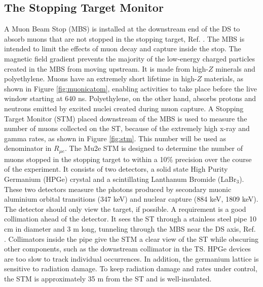 \subsection{The Stopping Target Monitor}
A Muon Beam Stop (MBS) is installed at the downstream end of the DS to 
absorb muons that are not stopped in the stopping target, Ref. \cite{bartoszek2015mu2e}. 
The MBS is intended to limit 
the effects of muon decay and capture inside the stop. The magnetic field gradient prevents 
the majority of the low-energy charged particles created in the MBS from moving upstream. 
It is made from high-$Z$ minerals and polyethylene. Muons have an extremely short lifetime 
in high-$Z$ materials, as shown in Figure \ref{fig:muonicatom}, enabling activities to take 
place before the live window starting at 640 ns. Polyethylene, on the other hand, absorbs 
protons and neutrons emitted by excited nuclei created during muon capture.
A Stopping Target Monitor (STM) 
placed downstream of the MBS is used to measure the number of muons collected on the ST, because of the extremely high x-ray and gamma rates, 
as shown in Figure \ref{fig:stm}. This number will be used as denominator in $R_{\mu e}$.
The Mu2e STM is designed to determine the number of muons stopped in the stopping target to within a 10\% precision over the course of the
experiment. It consists of two detectors, a solid state High Purity Germanium (HPGe) crystal and a 
scintillating Lanthanum Bromide (LaBr$_3$). These two detectors measure the photons produced by secondary muonic aluminium orbital transitions (347 keV) and nuclear capture (884 keV, 1809 keV). 
The detector should only view the target, if possible. A requirement 
is a good collimation ahead of the detector. It sees the ST through a stainless steel 
pipe 10 cm in diameter and 3 m long, tunneling through the MBS near the DS axis, Ref. \cite{stm}. 
Collimators inside the pipe give the STM a clear view of the ST while obscuring other 
components, such as the downstream collimator in the TS. HPGe devices are too slow to track individual 
occurrences. In addition, the germanium lattice is sensitive to radiation damage. To keep radiation 
damage and rates under control, the STM is approximately 35 m from the ST and is 
well-insulated.

